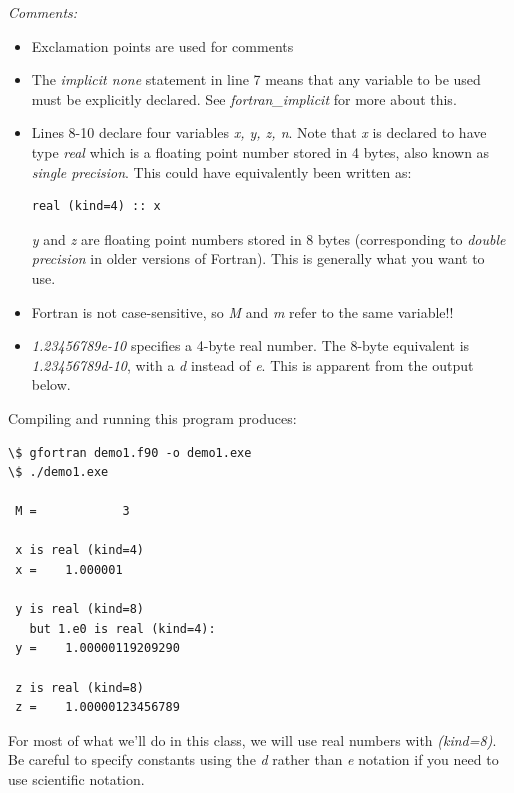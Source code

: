 \documentclass[letterpaper,10pt,english]{sphinxmanual}
\begin{document}
\emph{Comments:}
\begin{itemize}
\item {} 
Exclamation points are used for comments

\item {} 
The \emph{implicit none} statement in line 7 means that any variable
to be used must be explicitly declared.  See
\emph{fortran\_implicit} for more about this.

\item {} 
Lines 8-10 declare four variables \emph{x, y, z, n}.   Note that \emph{x} is declared to
have type \emph{real} which is a floating point number stored in 4
bytes, also known as \emph{single precision}.  This could have
equivalently been written as:

\begin{Verbatim}[commandchars=\\\{\}]
real (kind=4) :: x
\end{Verbatim}

\emph{y} and \emph{z} are floating point numbers stored in 8 bytes
(corresponding to \emph{double precision} in older versions of
Fortran).  This is generally what you want to use.

\item {} 
Fortran is not case-sensitive, so \emph{M} and \emph{m} refer to the same
variable!!

\item {} 
\emph{1.23456789e-10} specifies a 4-byte real number.  The 8-byte
equivalent is \emph{1.23456789d-10}, with a \emph{d} instead of \emph{e}.
This is apparent from the output below.

\end{itemize}

Compiling and running this program produces:

\begin{Verbatim}[commandchars=\\\{\}]
\$ gfortran demo1.f90 -o demo1.exe
\$ ./demo1.exe

 M =            3

 x is real (kind=4)
 x =    1.000001

 y is real (kind=8)
   but 1.e0 is real (kind=4):
 y =    1.00000119209290

 z is real (kind=8)
 z =    1.00000123456789
\end{Verbatim}

For most of what we'll do in this class, we will use real numbers
with \emph{(kind=8)}.  Be careful to specify constants using the \emph{d}
rather than \emph{e} notation if you need to use scientific notation.
\end{document}
